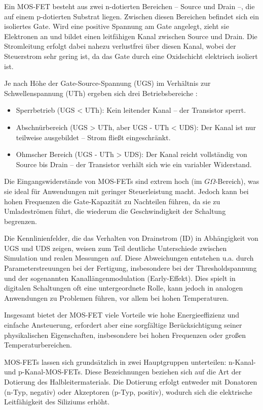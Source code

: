 Ein MOS-FET besteht aus zwei n-dotierten Bereichen – Source und Drain –, die auf einem p-dotierten Substrat liegen. Zwischen diesen Bereichen befindet sich ein isoliertes Gate. Wird eine positive Spannung am Gate angelegt, zieht sie Elektronen an und bildet einen leitfähigen Kanal zwischen Source und Drain. Die Stromleitung erfolgt dabei nahezu verlustfrei über diesen Kanal, wobei der Steuerstrom sehr gering ist, da das Gate durch eine Oxidschicht elektrisch isoliert ist.\cite{Alles2024}

Je nach Höhe der Gate-Source-Spannung (UGS) im Verhältnis zur Schwellenspannung (UTh) ergeben sich drei Betriebsbereiche \cite{Alles2024}:
\begin{itemize}
	\item Sperrbetrieb (UGS < UTh): Kein leitender Kanal – der Transistor sperrt.
	\item Abschnürbereich (UGS > UTh, aber UGS - UTh < UDS): Der Kanal ist nur teilweise ausgebildet – Strom fließt eingeschränkt.
	\item Ohmscher Bereich (UGS - UTh > UDS): Der Kanal reicht vollständig von Source bis Drain – der Transistor verhält sich wie ein variabler Widerstand.
\end{itemize}
Die Eingangswiderstände von MOS-FETs sind extrem hoch (im $G\Omega$-Bereich), was sie ideal für Anwendungen mit geringer Steuerleistung macht. Jedoch kann bei hohen Frequenzen die Gate-Kapazität zu Nachteilen führen, da sie zu Umladeströmen führt, die wiederum die Geschwindigkeit der Schaltung begrenzen.\cite{Alles2024}

Die Kennlinienfelder, die das Verhalten von Drainstrom (ID) in Abhängigkeit von UGS und UDS zeigen, weisen zum Teil deutliche Unterschiede zwischen Simulation und realen Messungen auf. Diese Abweichungen entstehen u.a. durch Parameterstreuungen bei der Fertigung, insbesondere bei der Thresholdspannung und der sogenannten Kanallängenmodulation (Early-Effekt). Dies spielt in digitalen Schaltungen oft eine untergeordnete Rolle, kann jedoch in analogen Anwendungen zu Problemen führen, vor allem bei hohen Temperaturen.\cite{Alles2024}

Insgesamt bietet der MOS-FET viele Vorteile wie hohe Energieeffizienz und einfache Ansteuerung, erfordert aber eine sorgfältige Berücksichtigung seiner physikalischen Eigenschaften, insbesondere bei hohen Frequenzen oder großen Temperaturbereichen.\cite{Alles2024}


MOS-FETs lassen sich grundsätzlich in zwei Hauptgruppen unterteilen: n-Kanal- und p-Kanal-MOS-FETs. Diese Bezeichnungen beziehen sich auf die Art der Dotierung des Halbleitermaterials. Die Dotierung erfolgt entweder mit Donatoren (n-Typ, negativ) oder Akzeptoren (p-Typ, positiv), wodurch sich die elektrische Leitfähigkeit des Siliziums erhöht. \cite{RSOnlineMOSFET:2025}

